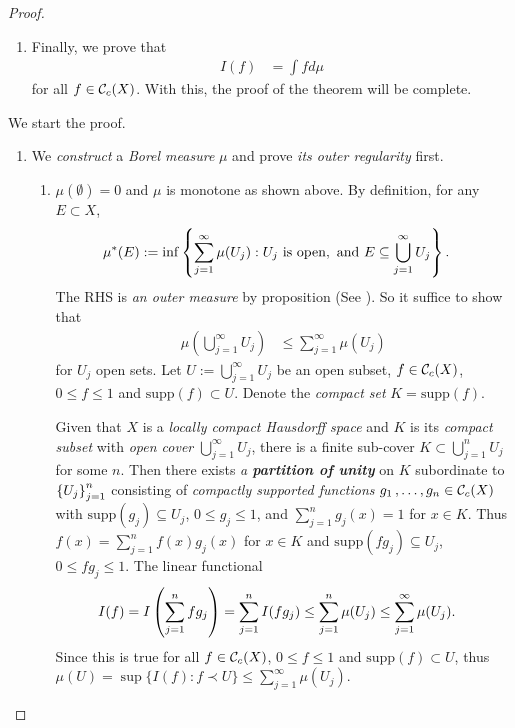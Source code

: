 \documentclass[11pt]{article}
\begin{document}
\begin{itemize}
\begin{proof}
\begin{enumerate}
\item Finally, we prove that 
\begin{align*}
I(f) &= \int f d\mu
\end{align*} for all $f \in {\mathcal C}_c(X)$. With this, the proof of the theorem will be complete. 
\end{enumerate}

We start the proof. 
\begin{enumerate}
\item We  \emph{construct} a \emph{Borel measure} $\mu$ and prove \emph{its outer regularity} first. 
\begin{enumerate}
\item $\mu(\emptyset) = 0$ and $\mu$ is monotone as shown above. By definition, for any $E\subset X$,
\begin{align*}
\mu^{*}(E) &:= \inf\left\{\sum_{j=1}^{\infty}\mu(U_j): U_j \text{ is open}, \text{ and } E \subseteq \bigcup_{j=1}^{\infty}U_j\right\}. 
\end{align*} The RHS is \emph{an outer measure} by proposition (See \citep{folland2013real}). So it suffice to show that 
\begin{align*}
\mu(\bigcup_{j=1}^{\infty}U_j) &\le \sum_{j=1}^{\infty}\mu(U_j)
\end{align*} for $U_j$ open sets. Let $U := \bigcup_{j=1}^{\infty}U_j$ be an open subset, $f \in {\mathcal C}_{c}(X)$, $0 \le f \le 1$ and $\text{supp}(f) \subset U$. Denote the \emph{compact set} $K= \text{supp}(f)$. 

Given that $X$ is a \emph{locally compact Hausdorff space} and $K$ is its \emph{compact subset} with \emph{open cover} $\bigcup_{j=1}^{\infty}U_j$, there is a finite sub-cover $K \subset \bigcup_{j=1}^{n}U_j$ for some $n$. Then there exists \emph{a \textbf{partition of unity}} on $K$ subordinate to $\left\{U_j\right\}_{j=1}^{n}$ consisting of \emph{compactly supported functions} $g_1 \,{,}\ldots{,}\, g_n \in  {\mathcal C}_{c}(X)$ with $\text{supp}(g_j) \subseteq U_j$, $0 \le g_j \le 1$, and $\sum_{j=1}^{n}g_j(x) = 1$ for $x \in K$. Thus $f(x) = \sum_{j=1}^{n}f(x)g_j(x)$ for $x \in K$ and $\text{supp}(f g_j) \subseteq U_j$, $0 \le f g_j \le 1$. The linear functional 
\begin{align*}
I(f) &= I\left(\sum_{j=1}^{n}fg_j\right) = \sum_{j=1}^{n}I(fg_j) \le  \sum_{j=1}^{n}\mu(U_j) \le \sum_{j=1}^{\infty}\mu(U_j).
\end{align*} Since this is true for all $f \in {\mathcal C}_{c}(X)$, $0 \le f \le 1$ and $\text{supp}(f) \subset U$, thus $\mu(U) = \sup\{I(f): f \prec U\} \le \sum_{j=1}^{\infty}\mu(U_j)$.


\end{enumerate}
\end{enumerate}
\end{proof}
\end{itemize}
\end{document}
